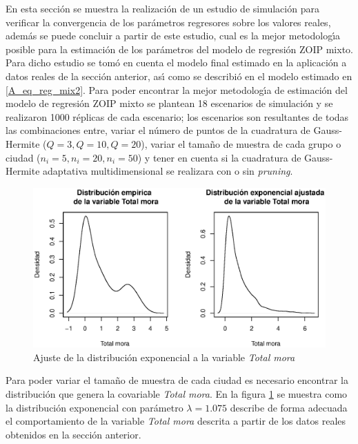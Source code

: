 En esta secci\'{o}n se muestra la realizaci\'{o}n de un estudio de simulaci\'{o}n para verificar la convergencia de los par\'{a}metros regresores sobre los valores reales, adem\'{a}s se puede concluir a partir de este estudio, cual es la mejor metodolog\'{\i}a posible para la estimaci\'{o}n de los par\'{a}metros del modelo de regresi\'{o}n ZOIP mixto. Para dicho estudio se tom\'{o} en cuenta el modelo final estimado en la aplicaci\'{o}n a datos reales de la secci\'{o}n anterior, as\'{\i} como se describi\'{o} en el modelo estimado en \eqref{A_eq_reg_mix2}. Para poder encontrar la mejor metodolog\'{\i}a de estimaci\'{o}n del modelo de regresi\'{o}n ZOIP mixto se plantean 18 escenarios de simulaci\'{o}n y se realizaron 1000 r\'{e}plicas de cada escenario; los escenarios son resultantes de todas las combinaciones entre, variar el n\'{u}mero de puntos de la cuadratura de Gauss-Hermite ($Q=3 , Q=10, Q=20$), variar el tama\~{n}o de muestra de cada grupo o ciudad ($n_i=5, n_i=20, n_i=50$) y tener en cuenta si la cuadratura de Gauss-Hermite adaptativa multidimensional se realizara con o sin \textit{pruning}.\\

\begin{figure}
	\begin{center}
		\includegraphics[scale=0.6]{Ajuste_expo_mix.eps}	
		\caption{Ajuste de la distribuci\'{o}n exponencial a la variable \textsl{Total mora}}
		\label{Ajuste_expo_mix}
	\end{center}
\end{figure}

Para poder variar el tama\~{n}o de muestra de cada ciudad es necesario encontrar la distribuci\'{o}n que genera la covariable \textsl{Total mora}. En la figura \ref{Ajuste_expo_mix} se muestra como la distribuci\'{o}n exponencial con par\'{a}metro $\lambda=1.075$ describe de forma adecuada el comportamiento de la variable \textsl{Total mora} descrita a partir de los datos reales obtenidos en la secci\'{o}n anterior.\\

